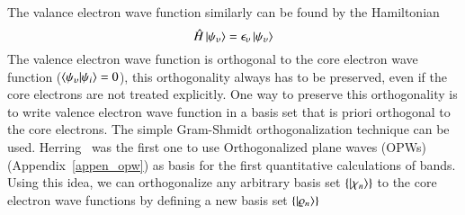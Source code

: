The valance electron wave function similarly can be found by the Hamiltonian
\begin{equation}
\label{eq_val_hamil}
\hat{H}\ket{\psi_{\upsilon}} = \epsilon_{\upsilon} \ket{\psi_{\upsilon}}
\end{equation}
The valence electron wave function is orthogonal to the core electron wave function ($\braket{\psi_{\upsilon}}{\psi_i}=0$), this orthogonality always has to be preserved, even if the core electrons are not treated explicitly. One way to preserve this orthogonality is to write valence electron wave function in a basis set that is priori orthogonal to the core electrons. The simple Gram-Shmidt orthogonalization technique can be used. Herring~\cite{herring1940new} was the first one to use Orthogonalized plane waves (OPWs)(Appendix~\ref{appen_opw}) as basis for the first quantitative calculations of bands. Using this idea, we can orthogonalize any arbitrary basis set $\{\ket{\chi_n}\}$ to the core electron wave functions by defining a new basis set $\{\ket{\varrho_n}\}$


